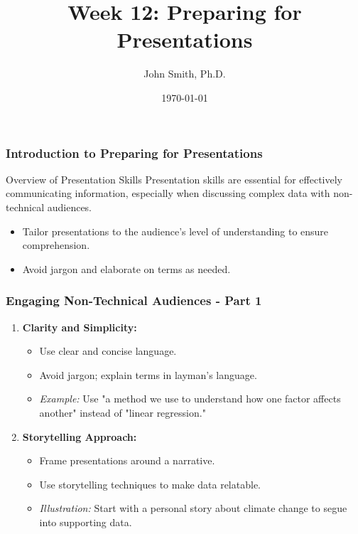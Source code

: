 \documentclass[aspectratio=169]{beamer}
\title[Preparing for Presentations]{Week 12: Preparing for Presentations}
\author[J. Smith]{John Smith, Ph.D.}
\institute[University Name]{
  Department of Computer Science\\
  University Name\\
  \vspace{0.3cm}
  Email: email@university.edu\\
  Website: www.university.edu
}
\date{\today}
\begin{document}
\frame{\titlepage}

\begin{frame}[fragile]
    \frametitle{Introduction to Preparing for Presentations}
    \begin{block}{Overview of Presentation Skills}
        Presentation skills are essential for effectively communicating information, especially when discussing complex data with non-technical audiences.
    \end{block}
    \begin{itemize}
        \item Tailor presentations to the audience's level of understanding to ensure comprehension.
        \item Avoid jargon and elaborate on terms as needed.
    \end{itemize}
\end{frame}

\begin{frame}[fragile]
    \frametitle{Engaging Non-Technical Audiences - Part 1}
    \begin{enumerate}
        \item \textbf{Clarity and Simplicity:}
            \begin{itemize}
                \item Use clear and concise language.
                \item Avoid jargon; explain terms in layman's language.
                \item \textit{Example:} Use "a method we use to understand how one factor affects another" instead of "linear regression."
            \end{itemize}
        \item \textbf{Storytelling Approach:}
            \begin{itemize}
                \item Frame presentations around a narrative.
                \item Use storytelling techniques to make data relatable.
                \item \textit{Illustration:} Start with a personal story about climate change to segue into supporting data.
            \end{itemize}
    \end{enumerate}
\end{frame}
\end{document}
